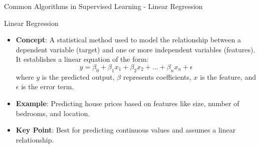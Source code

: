 \documentclass[aspectratio=169]{beamer}
\begin{document}
\begin{frame}[fragile]{Common Algorithms in Supervised Learning - Linear Regression}
    \begin{block}{Linear Regression}
        \begin{itemize}
            \item \textbf{Concept}: A statistical method used to model the relationship between a dependent variable (target) and one or more independent variables (features). It establishes a linear equation of the form:
            \begin{equation}
            y = \beta_0 + \beta_1x_1 + \beta_2x_2 + ... + \beta_nx_n + \epsilon
            \end{equation}
            where \( y \) is the predicted output, \( \beta \) represents coefficients, \( x \) is the feature, and \( \epsilon \) is the error term.
            \item \textbf{Example}: Predicting house prices based on features like size, number of bedrooms, and location.
            \item \textbf{Key Point}: Best for predicting continuous values and assumes a linear relationship.
        \end{itemize}
    \end{block}
\end{frame}
\end{document}
